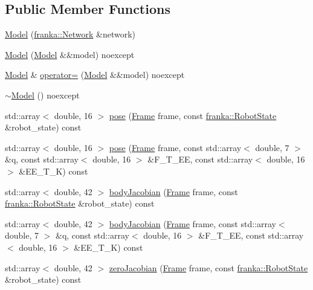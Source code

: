 \subsection*{Public Member Functions}
\begin{DoxyCompactItemize}
\item 
\hyperlink{classfranka_1_1Model_a751d939935eb51f06dcfd18c6c756ceb}{Model} (\hyperlink{classfranka_1_1Network}{franka\+::\+Network} \&network)
\item 
\hyperlink{classfranka_1_1Model_a8b58ff37f62512aecdcd0e6aabfd9548}{Model} (\hyperlink{classfranka_1_1Model}{Model} \&\&model) noexcept
\item 
\hyperlink{classfranka_1_1Model}{Model} \& \hyperlink{classfranka_1_1Model_ae45b00c240eb10447beda17f4b916ca8}{operator=} (\hyperlink{classfranka_1_1Model}{Model} \&\&model) noexcept
\item 
\hyperlink{classfranka_1_1Model_a1d6ffa26afc6cfdff7e329d15b8bd65e}{$\sim$\+Model} () noexcept
\item 
std\+::array$<$ double, 16 $>$ \hyperlink{classfranka_1_1Model_adcd68a474d3843e5d9699c0f37fc76e8}{pose} (\hyperlink{namespacefranka_a00b729ddce916481d3f0d10febec4f5b}{Frame} frame, const \hyperlink{structfranka_1_1RobotState}{franka\+::\+Robot\+State} \&robot\+\_\+state) const
\item 
std\+::array$<$ double, 16 $>$ \hyperlink{classfranka_1_1Model_a0961c236a435b5378dcfc732a22c632d}{pose} (\hyperlink{namespacefranka_a00b729ddce916481d3f0d10febec4f5b}{Frame} frame, const std\+::array$<$ double, 7 $>$ \&q, const std\+::array$<$ double, 16 $>$ \&F\+\_\+\+T\+\_\+\+EE, const std\+::array$<$ double, 16 $>$ \&E\+E\+\_\+\+T\+\_\+K) const
\item 
std\+::array$<$ double, 42 $>$ \hyperlink{classfranka_1_1Model_af5525104e79cd6b8b05adbf83dc328c1}{body\+Jacobian} (\hyperlink{namespacefranka_a00b729ddce916481d3f0d10febec4f5b}{Frame} frame, const \hyperlink{structfranka_1_1RobotState}{franka\+::\+Robot\+State} \&robot\+\_\+state) const
\item 
std\+::array$<$ double, 42 $>$ \hyperlink{classfranka_1_1Model_a9ce79d7c8a1461ba7769e7348ce85b4d}{body\+Jacobian} (\hyperlink{namespacefranka_a00b729ddce916481d3f0d10febec4f5b}{Frame} frame, const std\+::array$<$ double, 7 $>$ \&q, const std\+::array$<$ double, 16 $>$ \&F\+\_\+\+T\+\_\+\+EE, const std\+::array$<$ double, 16 $>$ \&E\+E\+\_\+\+T\+\_\+K) const
\item 
std\+::array$<$ double, 42 $>$ \hyperlink{classfranka_1_1Model_a0b0fb1bf5f54be87bfaa023e4d0c5b9f}{zero\+Jacobian} (\hyperlink{namespacefranka_a00b729ddce916481d3f0d10febec4f5b}{Frame} frame, const \hyperlink{structfranka_1_1RobotState}{franka\+::\+Robot\+State} \&robot\+\_\+state) const

\end{DoxyCompactItemize}
